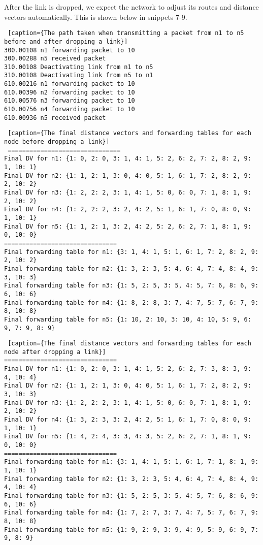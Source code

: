 \documentclass[11pt]{article}
\begin{document}
After the link is dropped, we expect the network to adjust its routes and distance vectors automatically. This is shown below in snippets 7-9.

 \begin{lstlisting} [caption={The path taken when transmitting a packet from n1 to n5 before and after dropping a link}]
300.00108 n1 forwarding packet to 10
300.00288 n5 received packet
310.00108 Deactivating link from n1 to n5
310.00108 Deactivating link from n5 to n1
610.00216 n1 forwarding packet to 10
610.00396 n2 forwarding packet to 10
610.00576 n3 forwarding packet to 10
610.00756 n4 forwarding packet to 10
610.00936 n5 received packet
\end{lstlisting}

 \begin{lstlisting} [caption={The final distance vectors and forwarding tables for each node before dropping a link}]
 ===============================
Final DV for n1: {1: 0, 2: 0, 3: 1, 4: 1, 5: 2, 6: 2, 7: 2, 8: 2, 9: 1, 10: 1}
Final DV for n2: {1: 1, 2: 1, 3: 0, 4: 0, 5: 1, 6: 1, 7: 2, 8: 2, 9: 2, 10: 2}
Final DV for n3: {1: 2, 2: 2, 3: 1, 4: 1, 5: 0, 6: 0, 7: 1, 8: 1, 9: 2, 10: 2}
Final DV for n4: {1: 2, 2: 2, 3: 2, 4: 2, 5: 1, 6: 1, 7: 0, 8: 0, 9: 1, 10: 1}
Final DV for n5: {1: 1, 2: 1, 3: 2, 4: 2, 5: 2, 6: 2, 7: 1, 8: 1, 9: 0, 10: 0}
===============================
Final forwarding table for n1: {3: 1, 4: 1, 5: 1, 6: 1, 7: 2, 8: 2, 9: 2, 10: 2}
Final forwarding table for n2: {1: 3, 2: 3, 5: 4, 6: 4, 7: 4, 8: 4, 9: 3, 10: 3}
Final forwarding table for n3: {1: 5, 2: 5, 3: 5, 4: 5, 7: 6, 8: 6, 9: 6, 10: 6}
Final forwarding table for n4: {1: 8, 2: 8, 3: 7, 4: 7, 5: 7, 6: 7, 9: 8, 10: 8}
Final forwarding table for n5: {1: 10, 2: 10, 3: 10, 4: 10, 5: 9, 6: 9, 7: 9, 8: 9}
\end{lstlisting}

 \begin{lstlisting} [caption={The final distance vectors and forwarding tables for each node after dropping a link}]
===============================
Final DV for n1: {1: 0, 2: 0, 3: 1, 4: 1, 5: 2, 6: 2, 7: 3, 8: 3, 9: 4, 10: 4}
Final DV for n2: {1: 1, 2: 1, 3: 0, 4: 0, 5: 1, 6: 1, 7: 2, 8: 2, 9: 3, 10: 3}
Final DV for n3: {1: 2, 2: 2, 3: 1, 4: 1, 5: 0, 6: 0, 7: 1, 8: 1, 9: 2, 10: 2}
Final DV for n4: {1: 3, 2: 3, 3: 2, 4: 2, 5: 1, 6: 1, 7: 0, 8: 0, 9: 1, 10: 1}
Final DV for n5: {1: 4, 2: 4, 3: 3, 4: 3, 5: 2, 6: 2, 7: 1, 8: 1, 9: 0, 10: 0}
===============================
Final forwarding table for n1: {3: 1, 4: 1, 5: 1, 6: 1, 7: 1, 8: 1, 9: 1, 10: 1}
Final forwarding table for n2: {1: 3, 2: 3, 5: 4, 6: 4, 7: 4, 8: 4, 9: 4, 10: 4}
Final forwarding table for n3: {1: 5, 2: 5, 3: 5, 4: 5, 7: 6, 8: 6, 9: 6, 10: 6}
Final forwarding table for n4: {1: 7, 2: 7, 3: 7, 4: 7, 5: 7, 6: 7, 9: 8, 10: 8}
Final forwarding table for n5: {1: 9, 2: 9, 3: 9, 4: 9, 5: 9, 6: 9, 7: 9, 8: 9}
 \end{lstlisting}
 
\end{document}
